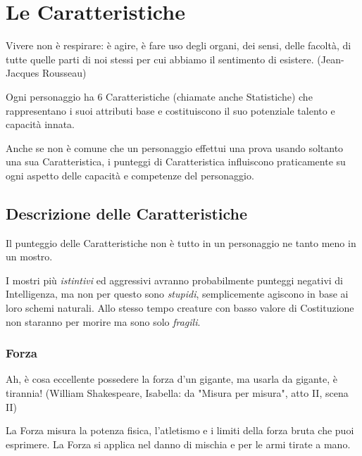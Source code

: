 \section{Le Caratteristiche}

\begin{enfasi}{
Vivere non è respirare: è agire, è fare uso degli organi, dei sensi, delle facoltà, di tutte quelle parti di noi stessi per cui abbiamo il sentimento di esistere. (Jean-Jacques Rousseau)
}\end{enfasi}

\begin{multicols}{2}

Ogni personaggio ha 6 Caratteristiche (chiamate anche Statistiche) che rappresentano i suoi attributi base e costituiscono il suo potenziale talento e capacità innata.

Anche se non è comune che un personaggio effettui una prova usando soltanto una sua Caratteristica, i punteggi di Caratteristica influiscono praticamente su ogni aspetto delle capacità e competenze del personaggio.

\subsection{Descrizione delle Caratteristiche}\label{decrizionedellecaratteristiche}

Il punteggio delle Caratteristiche non è tutto in un personaggio ne tanto meno in un mostro.

I mostri più \emph{istintivi} ed aggressivi avranno probabilmente punteggi negativi di Intelligenza, ma non per questo sono \emph{stupidi}, semplicemente agiscono in base ai loro schemi naturali. Allo stesso tempo creature con basso valore di Costituzione non staranno per morire ma sono solo \emph{fragili}.

\subsubsection{Forza}\label{forza}

\begin{enfasi}{
Ah, è cosa eccellente possedere la forza d'un gigante, ma usarla da gigante, è tirannia! (William Shakespeare, Isabella: da "Misura per misura", atto II, scena II)
}\end{enfasi}

La Forza misura la potenza fisica, l'atletismo e i limiti della forza bruta che puoi esprimere. La Forza si applica nel danno di mischia e per le armi tirate a mano.


\end{multicols}
